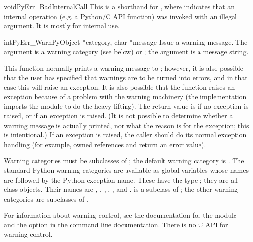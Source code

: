\begin{cfuncdesc}{void}{PyErr_BadInternalCall}{}
  This is a shorthand for , where  indicates that an internal
  operation (e.g. a Python/C API function) was invoked with an illegal
  argument.  It is mostly for internal use.
\end{cfuncdesc}

\begin{cfuncdesc}{int}{PyErr_Warn}{PyObject *category, char *message}
  Issue a warning message.  The  argument is a warning
  category (see below) or \NULL; the  argument is a
  message string.

  This function normally prints a warning message to ;
  however, it is also possible that the user has specified that
  warnings are to be turned into errors, and in that case this will
  raise an exception.  It is also possible that the function raises an
  exception because of a problem with the warning machinery (the
  implementation imports the  module to do the heavy
  lifting).  The return value is  if no exception is raised,
  or  if an exception is raised.  (It is not possible to
  determine whether a warning message is actually printed, nor what
  the reason is for the exception; this is intentional.)  If an
  exception is raised, the caller should do its normal exception
  handling (for example,  owned references and
  return an error value).

  Warning categories must be subclasses of ; the
  default warning category is .  The standard
  Python warning categories are available as global variables whose
  names are  followed by the Python exception name.
  These have the type ; they are all class objects.
  Their names are , ,
  , ,
  , and .
   is a subclass of ; the
  other warning categories are subclasses of .

  For information about warning control, see the documentation for the
   module and the  option in the
  command line documentation.  There is no C API for warning control.
\end{cfuncdesc}

